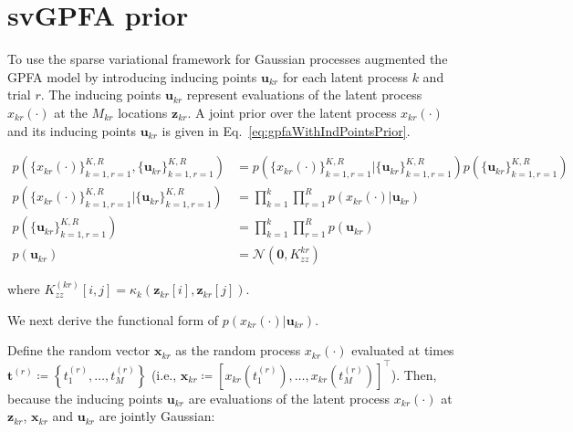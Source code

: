 \documentclass[12pt]{article}
\begin{document}
\section{svGPFA prior}

To use the sparse variational framework for Gaussian processes \citet{dunckerAndSahani18} augmented the GPFA model by introducing inducing
points $\mathbf{u}_{kr}$ for each latent process $k$ and trial $r$. The
inducing points $\mathbf{\mathbf{u}}_{kr}$ represent evaluations of the latent
process $x_{kr}(\cdot)$ at the $M_{kr}$ locations $\mathbf{\mathbf{z}}_{kr}$. A
joint prior over the latent process $x_{kr}(\cdot)$ and its inducing points
$\mathbf{u}_{kr}$ is given in Eq.~\ref{eq:gpfaWithIndPointsPrior}.

\begin{equation}
    \begin{aligned}
        p(\{x_{kr}(\cdot)\}_{k=1,r=1}^{K,R},\{\mathbf{u}_{kr}\}_{k=1,r=1}^{K,R}) &= p(\{x_{kr}(\cdot)\}_{k=1,r=1}^{K,R}|\{\mathbf{u}_{kr}\}_{k=1,r=1}^{K,R})p(\{\mathbf{u}_{kr}\}_  {k=1,r=1}^{K,R})\\
        p(\{x_{kr}(\cdot)\}_{k=1,r=1}^{K,R}|\{\mathbf{u}_{kr}\}_  {k=1,r=1}^{K,R}) &= \prod_{k=1}^k\prod_{r=1}^{R}p(x_{kr}(\cdot)|\mathbf{u}_{kr})\\
        p(\{\mathbf{u}_{kr}\}_{k=1,r=1}^{K,R})&=\prod_{k=1}^k\prod_{r=1}^{R}p(\mathbf{u}_{kr})\\
        p(\mathbf{u}_{kr})&=\mathcal{N}(\mathbf{0},K^{kr}_{zz})
    \end{aligned}
    \label{eq:gpfaWithIndPointsPrior}
\end{equation}

\noindent where $K_{zz}^{(kr)}[i,j]=\kappa_k(\mathbf{z}_{kr}[i],\mathbf{z}_{kr}[j])$.

We next derive the functional form of $p(x_{kr}(\cdot)|\mathbf{u}_{kr})$.

Define the random vector $\mathbf{x}_{kr}$ as the random process
$x_{kr}(\cdot)$ evaluated at times
$\mathbf{t}^{(r)}\coloneqq\left\{t_1^{(r)},\ldots,t_M^{(r)}\right\}$ (i.e.,
$\mathbf{x}_{kr}\coloneqq[x_{kr}(t_1^{(r)}),\ldots,x_{kr}(t_M^{(r)})]^\intercal$).
Then, because the inducing points $\mathbf{u}_{kr}$ are evaluations of the
latent process $x_{kr}(\cdot)$ at $\mathbf{z}_{kr}$, $\mathbf{x}_{kr}$ and
$\mathbf{u}_{kr}$ are jointly Gaussian:
\end{document}
